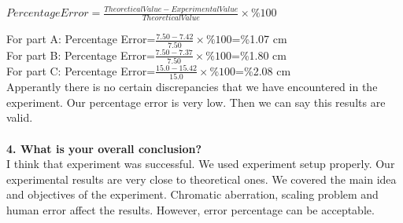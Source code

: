 \documentclass[a4paper,12pt]{report}
\begin{document}
\begin{center}
	$PercentageError=\frac{Theoretical Value-Experimental Value }{Theoretical Value}\times\%100$
\end{center}
For part A: Percentage Error=$\frac{7.50-7.42}{7.50}\times\%100$=\%1.07 cm\\
For part B: Percentage Error=$\frac{7.50-7.37}{7.50}\times\%100$=\%1.80 cm\\
For part C: Percentage Error=$\frac{15.0-15.42}{15.0}\times\%100$=\%2.08 cm\\
Apperantly there is no certain discrepancies that we have encountered in the experiment. Our percentage error is very low. Then we can say this results are valid.\\\\
\textbf{4. What is your overall conclusion?}\\
I think that experiment was successful. We used experiment setup properly. Our experimental results are very close to theoretical ones. We covered the main idea and objectives of the experiment. Chromatic aberration, scaling problem and human error affect the results. However, error percentage can be acceptable. 
\end{document}
